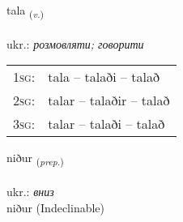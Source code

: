 \documentclass[frontgrid, backgrid]{flacards}\usepackage[]{graphicx}\usepackage[]{xcolor}
\begin{document}
{tala \small{\textsubscript{(\textit{v.})}} \\[1ex] %
\textphonetic{[tʰaːla]} \\
ukr.: \emph{розмовляти; говорити} \\  [2ex]
\renewcommand*{\arraystretch}{0.8}
\begin{tabular}{p{1cm}l}
\textsc{1sg}: & tala -- talaði -- talað \\ 
\textsc{2sg}: & talar -- talaðir -- talað \\ 
\textsc{3sg}: & talar -- talaði -- talað \\ 
\end{tabular}
}


\renewcommand{\flhead}{\vskip5pt \fboxsep=0pt {\small\bfseries\footnotesize Forsetning | прийменник}}
\renewcommand{\fcfoot}{\vskip5pt \fboxsep=0pt \hspace{2pt}{\small\bfseries\footnotesize 1K}}

\renewcommand{\blhead}{\vskip5pt {\small\bfseries\footnotesize Forsetning | прийменник }}
\renewcommand{\bcfoot}{\vskip5pt \hspace{2pt}{\small\bfseries\footnotesize 1K}}


{niður \small{\textsubscript{(\textit{prep.})}} \\[1ex]
\textphonetic{[nɪːðʏr]} \\
ukr.: \emph{вниз} \\  [2ex]
niður (Indeclinable)}


\renewcommand{\flhead}{\vskip5pt \fboxsep=0pt {\small\bfseries\footnotesize Atviksorð | прислівник}}
\renewcommand{\fcfoot}{\vskip5pt \fboxsep=0pt \hspace{2pt}{\small\bfseries\footnotesize 1K}}

\renewcommand{\blhead}{\vskip5pt {\small\bfseries\footnotesize Atviksorð | прислівник }}
\renewcommand{\bcfoot}{\vskip5pt \hspace{2pt}{\small\bfseries\footnotesize 1K}}
\end{document}
